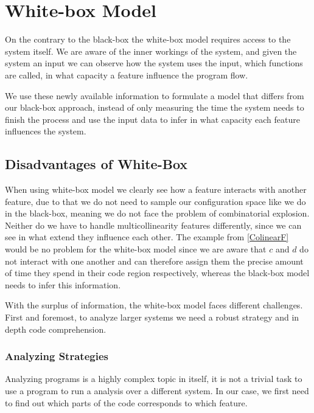 \section{White-box Model}\label{ch:Whitebox}


On the contrary to the black-box the white-box model requires access to the system itself. 
We are aware of the inner workings of the system, and given the system an input we can observe how the system uses the input, which functions are called, 
in what capacity a feature influence the program flow. 

We use these newly available information to formulate a model that differs from our black-box approach, instead of only measuring the time the system
needs to finish the process and use the input data to infer in what capacity each feature influences the system. 

\subsection{Disadvantages of White-Box}
When using white-box model we clearly see how a feature interacts with another feature, due to that we do not need to sample our configuration space like
we do in the black-box, meaning we do not face the problem of combinatorial explosion. 
Neither do we have to handle multicollinearity features differently, since we can see in what extend they influence each other. 
The example from \ref{ColinearF} would be no problem for the white-box model since we are aware that $c$ and $d$ do not interact with one another and can
therefore assign them the precise amount of time they spend in their code region respectively, whereas the black-box model needs to infer this information.

With the surplus of information, the white-box model faces different challenges. 
First and foremost, to analyze larger systems we need a robust strategy and in depth code comprehension.

\subsubsection{Analyzing Strategies}
Analyzing programs is a highly complex topic in itself, it is not a trivial task to use a program to run a analysis over a different system.
In our case, we first need to find out which parts of the code corresponds to which feature.

